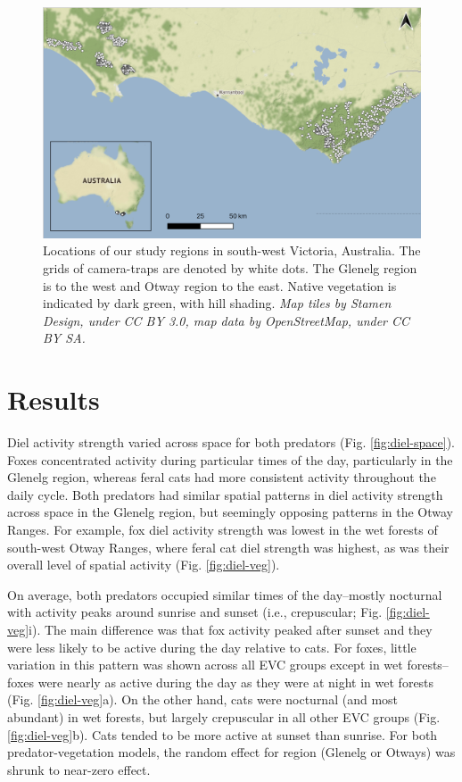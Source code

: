 \documentclass[11pt,a4paper,titlepage,twoside,openright]{style/unimelbthesis}
\begin{document}
\begin{mainmatter}
\begin{figure}
{\centering \includegraphics[width=1\linewidth]{figure/c4/fig1_map} 

}

\caption{Locations of our study regions in south-west Victoria, Australia. The grids of camera-traps are denoted by white dots. The Glenelg region is to the west and Otway region to the east. Native vegetation is indicated by dark green, with hill shading. \textit{Map tiles by Stamen Design, under CC BY 3.0, map data by OpenStreetMap, under CC BY SA.}}\label{fig:diel-map}
\end{figure}
\newpage

\hypertarget{results-1}{%
\section{Results}\label{results-1}}

Diel activity strength varied across space for both predators (Fig. \ref{fig:diel-space}). Foxes concentrated activity during particular times of the day, particularly in the Glenelg region, whereas feral cats had more consistent activity throughout the daily cycle. Both predators had similar spatial patterns in diel activity strength across space in the Glenelg region, but seemingly opposing patterns in the Otway Ranges. For example, fox diel activity strength was lowest in the wet forests of south-west Otway Ranges, where feral cat diel strength was highest, as was their overall level of spatial activity (Fig. \ref{fig:diel-veg}).

On average, both predators occupied similar times of the day--mostly nocturnal with activity peaks around sunrise and sunset (i.e., crepuscular; Fig. \ref{fig:diel-veg}i). The main difference was that fox activity peaked after sunset and they were less likely to be active during the day relative to cats. For foxes, little variation in this pattern was shown across all EVC groups except in wet forests--foxes were nearly as active during the day as they were at night in wet forests (Fig. \ref{fig:diel-veg}a). On the other hand, cats were nocturnal (and most abundant) in wet forests, but largely crepuscular in all other EVC groups (Fig. \ref{fig:diel-veg}b). Cats tended to be more active at sunset than sunrise. For both predator-vegetation models, the random effect for region (Glenelg or Otways) was shrunk to near-zero effect.


\end{mainmatter}
\end{document}
